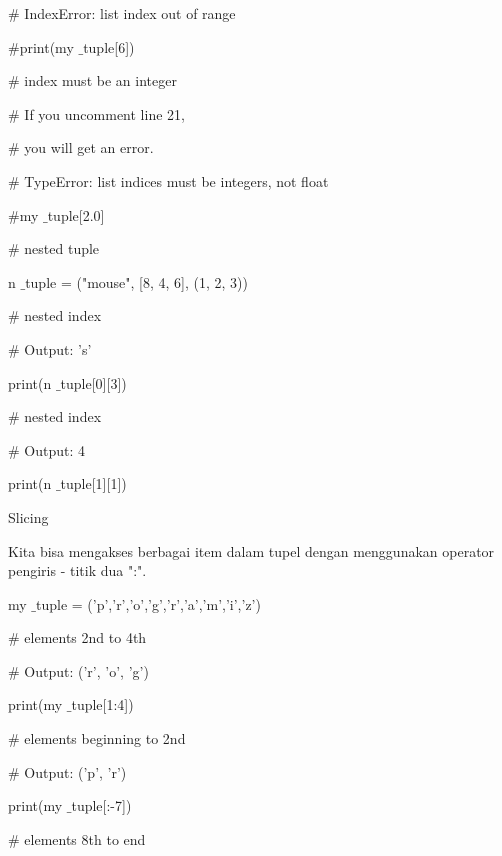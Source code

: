  $  \#  $ IndexError: list index out of range \par
\vspace{12pt}
 $  \#  $print(my $  \_  $tuple[6]) \par
\vspace{12pt}
 $  \#  $ index must be an integer \par
 $  \#  $ If you uncomment line 21, \par
 $  \#  $ you will get an error. \par
 $  \#  $ TypeError: list indices must be integers, not float \par
\vspace{12pt}
 $  \#  $my $  \_  $tuple[2.0] \par
\vspace{12pt}
 $  \#  $ nested tuple \par
n $  \_  $tuple = ("mouse", [8, 4, 6], (1, 2, 3)) \par
\vspace{12pt}
 $  \#  $ nested index \par
 $  \#  $ Output: 's' \par
print(n $  \_  $tuple[0][3]) \par
\vspace{12pt}
 $  \#  $ nested index \par
 $  \#  $ Output: 4 \par
print(n $  \_  $tuple[1][1]) \par
\vspace{12pt}
Slicing \par
\vspace{12pt}
Kita bisa mengakses berbagai item dalam tupel dengan menggunakan operator pengiris - titik dua ":". \par
\vspace{12pt}
my $  \_  $tuple = ('p','r','o','g','r','a','m','i','z') \par
\vspace{12pt}
 $  \#  $ elements 2nd to 4th \par
 $  \#  $ Output: ('r', 'o', 'g') \par
print(my $  \_  $tuple[1:4]) \par
\vspace{12pt}
 $  \#  $ elements beginning to 2nd \par
 $  \#  $ Output: ('p', 'r') \par
print(my $  \_  $tuple[:-7]) \par
\vspace{12pt}
 $  \#  $ elements 8th to end \par
